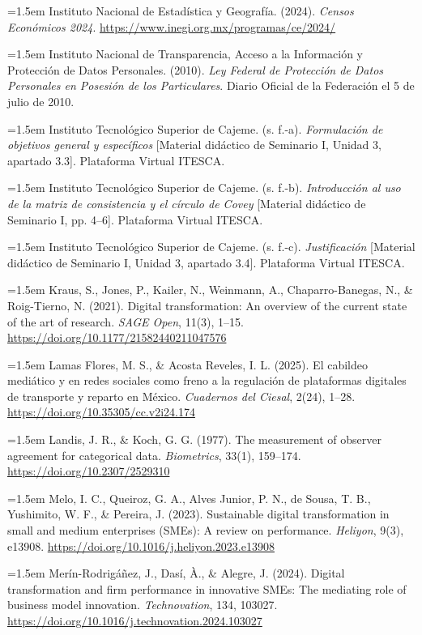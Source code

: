 {\hangindent=1.5em Instituto Nacional de Estadística y Geografía. (2024). \textit{Censos Económicos 2024}. \url{https://www.inegi.org.mx/programas/ce/2024/}

\hangindent=1.5em Instituto Nacional de Transparencia, Acceso a la Información y Protección de Datos Personales. (2010). \textit{Ley Federal de Protección de Datos Personales en Posesión de los Particulares}. Diario Oficial de la Federación el 5 de julio de 2010.

\hangindent=1.5em Instituto Tecnológico Superior de Cajeme. (s. f.-a). \textit{Formulación de objetivos general y específicos} [Material didáctico de Seminario I, Unidad 3, apartado 3.3]. Plataforma Virtual ITESCA.

\hangindent=1.5em Instituto Tecnológico Superior de Cajeme. (s. f.-b). \textit{Introducción al uso de la matriz de consistencia y el círculo de Covey} [Material didáctico de Seminario I, pp. 4--6]. Plataforma Virtual ITESCA.

\hangindent=1.5em Instituto Tecnológico Superior de Cajeme. (s. f.-c). \textit{Justificación} [Material didáctico de Seminario I, Unidad 3, apartado 3.4]. Plataforma Virtual ITESCA.

\hangindent=1.5em Kraus, S., Jones, P., Kailer, N., Weinmann, A., Chaparro-Banegas, N., \& Roig-Tierno, N. (2021). Digital transformation: An overview of the current state of the art of research. \textit{SAGE Open}, 11(3), 1--15. \url{https://doi.org/10.1177/21582440211047576}

\hangindent=1.5em Lamas Flores, M. S., \& Acosta Reveles, I. L. (2025). El cabildeo mediático y en redes sociales como freno a la regulación de plataformas digitales de transporte y reparto en México. \textit{Cuadernos del Ciesal}, 2(24), 1--28. \url{https://doi.org/10.35305/cc.v2i24.174}

\hangindent=1.5em Landis, J. R., \& Koch, G. G. (1977). The measurement of observer agreement for categorical data. \textit{Biometrics}, 33(1), 159--174. \url{https://doi.org/10.2307/2529310}

\hangindent=1.5em Melo, I. C., Queiroz, G. A., Alves Junior, P. N., de Sousa, T. B., Yushimito, W. F., \& Pereira, J. (2023). Sustainable digital transformation in small and medium enterprises (SMEs): A review on performance. \textit{Heliyon}, 9(3), e13908. \url{https://doi.org/10.1016/j.heliyon.2023.e13908}

\hangindent=1.5em Merín-Rodrigáñez, J., Dasí, À., \& Alegre, J. (2024). Digital transformation and firm performance in innovative SMEs: The mediating role of business model innovation. \textit{Technovation}, 134, 103027. \url{https://doi.org/10.1016/j.technovation.2024.103027}

}
